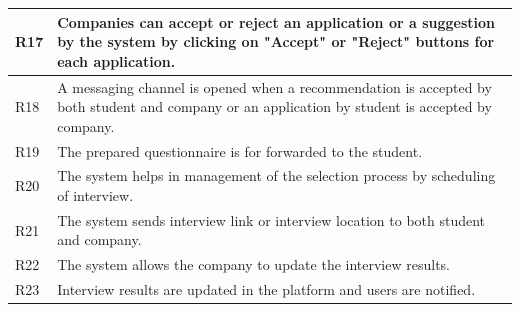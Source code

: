 \begin{xltabular}{\textwidth}{| l | X |}
\hline
R17 & Companies can accept or reject an application or a suggestion by the system by clicking on "Accept" or "Reject" buttons for each application. \\ [1ex]
\hline
R18 & A messaging channel is opened when a recommendation is accepted by both student and company or an application by student is accepted by company. \\ [1ex]
\hline
R19 & The prepared questionnaire is for forwarded to the student. \\ [1ex]
\hline
R20 & The system helps in management of the selection process by scheduling of interview. \\ [1ex]
\hline
R21& The system sends interview link or interview location to both student and company. \\ [1ex]
\hline
R22 & The system allows the company to update the interview results. \\ [1ex]
\hline
R23 & Interview results are updated in the platform and users are notified. \\ [1ex]
\hline
\end{xltabular}

\vspace{1.5em} %

